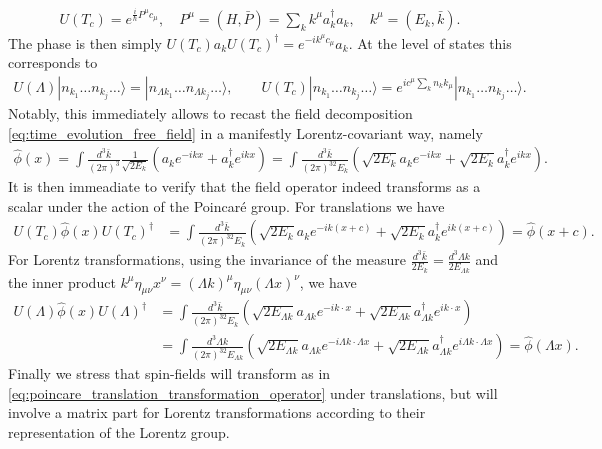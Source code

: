 \documentclass[../QFT_main.tex]{subfiles}
\begin{document}
\begin{mytheorem}
\begin{align}
    U(T_c)= e^{\tfrac{i}{\hbar}P^\mu c_\mu}, \quad P^\mu= (H, \bar{P})=\sum_{{k}}k^\mu a_k^{\dagger} a_k, \quad k^\mu=(E_k, \bar{k}).
\end{align}
The phase is then simply $U(T_c) a_k U(T_c)^\dagger = e^{-i k^\mu c_\mu} a_k$.
At the level of states this corresponds to
\begin{align}
    U(\Lambda)|{n}_{k_1}\dots {n}_{k_j}\dots \rangle = |{n}_{\Lambda k_1}\dots {n}_{\Lambda k_j}\dots \rangle, \qquad
    U(T_c)|{n}_{k_1}\dots {n}_{k_j}\dots \rangle = e^{i c^\mu \sum_{k} n_k k_\mu} |{n}_{k_1}\dots {n}_{k_j}\dots \rangle.
\end{align}
Notably, this immediately allows to recast the field decomposition \eqref{eq:time_evolution_free_field} in a manifestly Lorentz-covariant way, namely
\begin{align}
    \hat{\phi}(x) = \int \frac{d^3\bar{k}}{(2\pi)^3} \frac{1}{\sqrt{2E_k}} \left( a_k e^{-ikx} + a_k^{\dagger} e^{ikx} \right)
    = \int \frac{d^3\bar{k}}{(2\pi)^32E_k}\left( \sqrt{2E_k} a_k e^{-ikx} + \sqrt{2E_k} a_k^\dagger e^{ikx} \right).
\end{align}
It is then immeadiate to verify that the field operator indeed transforms as a scalar under the action of the Poincar\'e group.
For translations we have
\begin{align}\label{eq:poincare_translation_transformation_operator}
    U(T_c) \hat{\phi}(x) U(T_c)^\dagger &= \int \frac{d^3\bar{k}}{(2\pi)^32E_k}\left( \sqrt{2E_k} a_k e^{-ik(x+c)} + \sqrt{2E_k} a_k^\dagger e^{ik(x+c)} \right) = \hat{\phi}(x+c).
\end{align}
For Lorentz transformations, using the invariance of the measure $\tfrac{d^3\bar{k}}{2E_k}=\tfrac{d^3\Lambda k}{2E_{\Lambda k}}$ and the inner product $k^\mu \eta_{\mu\nu} x^\nu =(\Lambda k)^\mu \eta_{\mu\nu} (\Lambda x)^\nu$, we have
{\small
\begin{align}
    U(\Lambda) \hat{\phi}(x) U(\Lambda)^\dagger &= \int \frac{d^3\bar{k}}{(2\pi)^32E_k}\left( \sqrt{2E_{\Lambda k}} a_{\Lambda k} e^{-i k\cdot x} + \sqrt{2E_{\Lambda k}} a_{\Lambda k}^\dagger e^{i k \cdot x} \right)
    \\
    &= \int \frac{d^3\Lambda k}{(2\pi)^32E_{\Lambda k}}\left( \sqrt{2E_{\Lambda k}} a_{\Lambda k} e^{-i \Lambda k \cdot\Lambda x} + \sqrt{2E_{\Lambda k}} a_{\Lambda k}^\dagger e^{i \Lambda k \cdot \Lambda x} \right)
    = \hat{\phi}(\Lambda x).
\end{align}}
Finally we stress that spin-fields will transform as in \eqref{eq:poincare_translation_transformation_operator} under translations, but will involve a matrix part for Lorentz transformations according to their representation of the Lorentz group.

\end{mytheorem}
\end{document}

